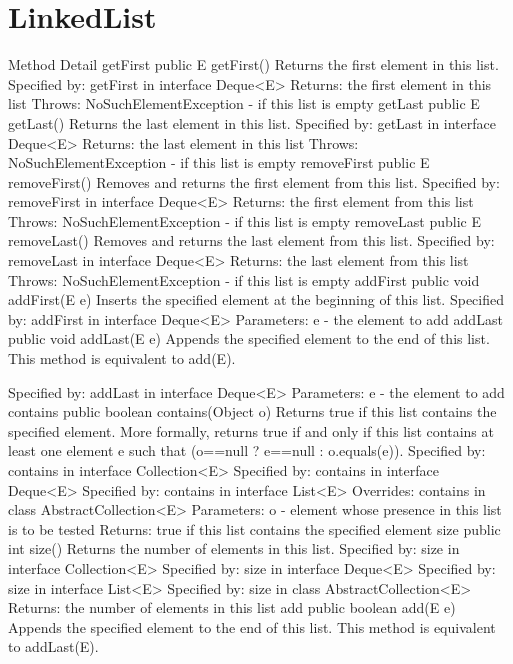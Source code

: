 \documentclass[babel]{book}
\begin{document}
\section{LinkedList}
Method Detail
getFirst
public E getFirst()
Returns the first element in this list.
Specified by:
getFirst in interface Deque<E>
Returns:
the first element in this list
Throws:
NoSuchElementException - if this list is empty
getLast
public E getLast()
Returns the last element in this list.
Specified by:
getLast in interface Deque<E>
Returns:
the last element in this list
Throws:
NoSuchElementException - if this list is empty
removeFirst
public E removeFirst()
Removes and returns the first element from this list.
Specified by:
removeFirst in interface Deque<E>
Returns:
the first element from this list
Throws:
NoSuchElementException - if this list is empty
removeLast
public E removeLast()
Removes and returns the last element from this list.
Specified by:
removeLast in interface Deque<E>
Returns:
the last element from this list
Throws:
NoSuchElementException - if this list is empty
addFirst
public void addFirst(E e)
Inserts the specified element at the beginning of this list.
Specified by:
addFirst in interface Deque<E>
Parameters:
e - the element to add
addLast
public void addLast(E e)
Appends the specified element to the end of this list.
This method is equivalent to add(E).

Specified by:
addLast in interface Deque<E>
Parameters:
e - the element to add
contains
public boolean contains(Object o)
Returns true if this list contains the specified element. More formally, returns true if and only if this list contains at least one element e such that (o==null ? e==null : o.equals(e)).
Specified by:
contains in interface Collection<E>
Specified by:
contains in interface Deque<E>
Specified by:
contains in interface List<E>
Overrides:
contains in class AbstractCollection<E>
Parameters:
o - element whose presence in this list is to be tested
Returns:
true if this list contains the specified element
size
public int size()
Returns the number of elements in this list.
Specified by:
size in interface Collection<E>
Specified by:
size in interface Deque<E>
Specified by:
size in interface List<E>
Specified by:
size in class AbstractCollection<E>
Returns:
the number of elements in this list
add
public boolean add(E e)
Appends the specified element to the end of this list.
This method is equivalent to addLast(E).
\end{document}
